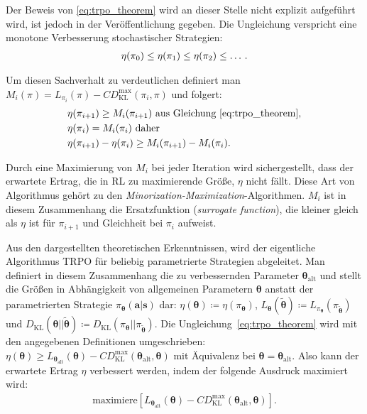 Der Beweis von \eqref{eq:trpo_theorem} wird an dieser Stelle nicht explizit aufgeführt wird, ist jedoch in der Veröffentlichung gegeben. Die Ungleichung verspricht eine monotone Verbesserung stochastischer Strategien:
\begin{align*}
\eta(\pi_0)\leq\eta(\pi_1)\leq\eta(\pi_2)\leq \dots \text{\,} .
\end{align*}

Um diesen Sachverhalt zu verdeutlichen definiert man
$M_i(\pi)=L_{\pi_i}(\pi)-CD_{\mathrm{KL}}^{\mathrm{max}}(\pi_i,\pi)$ und folgert:
\begin{align}
&\eta(\pi_{i+1}) \geq M_i(\pi_{i+1}) \text{ aus Gleichung~}\eqref{eq:trpo_theorem},  \\
&\eta(\pi_i) = M_i(\pi_i)\text{ daher } \nonumber \\
&\eta(\pi_{i+1})-\eta(\pi_i) \geq M_i(\pi_{i+1})-M_i(\pi_i). \nonumber
\label{eq:monotone_verbesserung}
\end{align}

Durch eine Maximierung von $M_i$ bei jeder Iteration wird sichergestellt, dass der erwartete Ertrag, die in RL zu maximierende Größe, $\eta$ nicht fällt. Diese Art von Algorithmus gehört zu den \textit{Minorization-Maximization}-Algorithmen. $M_i$ ist in diesem Zusammenhang die Ersatzfunktion (\textit{surrogate function}), die kleiner gleich als $\eta$ ist für $\pi_{i+1}$ und Gleichheit bei $\pi_i$ aufweist. 

Aus den dargestellten theoretischen Erkenntnissen, wird der eigentliche Algorithmus TRPO für beliebig parametrierte Strategien abgeleitet. Man definiert in diesem Zusammenhang die zu verbessernden Parameter 
$\bm{\theta}_{\mathrm{alt}}$ und stellt die Größen in Abhängigkeit von allgemeinen Parametern $\bm{\theta}$ anstatt der parametrierten Strategie $\pi_{\bm{\theta}}(\bm{a}|\bm{s})$ dar:
$\eta(\bm{\theta}) \coloneqq \eta(\pi_{\bm{\theta}})$, 
$L_{\bm{\theta}}(\tilde{\bm{\theta}})  \coloneqq L_{\pi_{\bm{\theta}}}(\pi_{\tilde{\bm{\theta}}})$ und
$D_{\mathrm{KL}}(\bm{\theta}||\tilde{\bm{\theta}}) \coloneqq
D_{\mathrm{KL}} (\pi_{\bm{\theta}}||\pi_{\tilde{\bm{\theta}}})$.
Die Ungleichung~\eqref{eq:trpo_theorem} wird mit den angegebenen Definitionen umgeschrieben:
$\eta(\bm{\theta}) \geq L_{\bm{\theta}_{\mathrm{alt}}}(\bm{\theta}) 
- CD_{\mathrm{KL}}^{\mathrm{max}}(\bm{\theta}_{\mathrm{alt}}, \bm{\theta})$ 
mit Äquivalenz bei $\bm{\theta} = \bm{\theta}_{\mathrm{alt}}$. Also kann der erwartete Ertrag $\eta$ verbessert werden, indem der folgende Ausdruck maximiert wird:
\begin{align*}
\mathrm{maximiere}\left[ L_{\bm{\theta}_{\mathrm{alt}}}(\bm{\theta}) 
- CD_{\mathrm{KL}}^{\mathrm{max}}(\bm{\theta}_{\mathrm{alt}}, \bm{\theta}) \right].
\end{align*}

